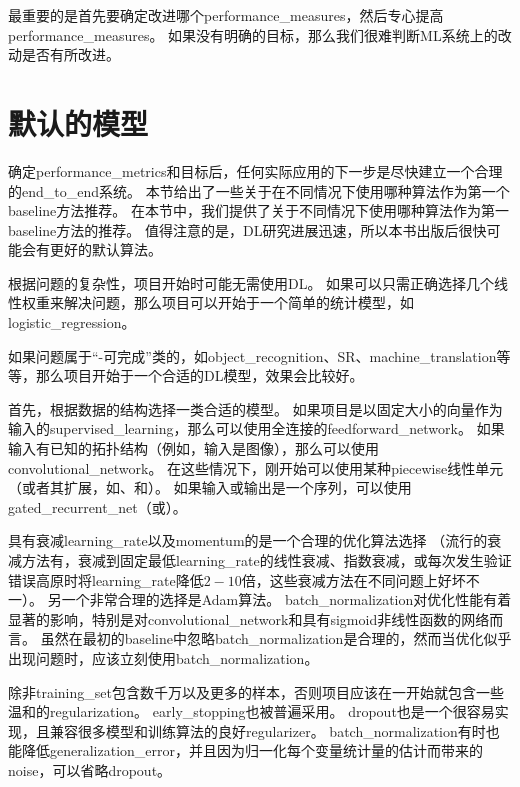 最重要的是首先要确定改进哪个\gls{performance_measures}，然后专心提高\gls{performance_measures}。
如果没有明确的目标，那么我们很难判断\gls{ML}系统上的改动是否有所改进。


\section{默认的模型}
\label{sec:default_baseline_models}
确定\gls{performance_metrics}和目标后，任何实际应用的下一步是尽快建立一个合理的\gls{end_to_end}系统。
本节给出了一些关于在不同情况下使用哪种算法作为第一个\gls{baseline}方法推荐。
在本节中，我们提供了关于不同情况下使用哪种算法作为第一\gls{baseline}方法的推荐。
值得注意的是，\gls{DL}研究进展迅速，所以本书出版后很快可能会有更好的默认算法。

根据问题的复杂性，项目开始时可能无需使用\gls{DL}。
如果可以只需正确选择几个线性权重来解决问题，那么项目可以开始于一个简单的统计模型，如\gls{logistic_regression}。


如果问题属于``-可完成''类的，如\gls{object_recognition}、\gls{SR}、\gls{machine_translation}等等，那么项目开始于一个合适的\gls{DL}模型，效果会比较好。


首先，根据数据的结构选择一类合适的模型。
如果项目是以固定大小的向量作为输入的\gls{supervised_learning}，那么可以使用全连接的\gls{feedforward_network}。
如果输入有已知的拓扑结构（例如，输入是图像），那么可以使用\gls{convolutional_network}。
在这些情况下，刚开始可以使用某种\gls{piecewise}线性单元（或者其扩展，如、和）。
如果输入或输出是一个序列，可以使用\gls{gated_recurrent_net}（或）。

具有衰减\gls{learning_rate}以及\gls{momentum}的是一个合理的优化算法选择
（流行的衰减方法有，衰减到固定最低\gls{learning_rate}的线性衰减、指数衰减，或每次发生验证错误高原时将\gls{learning_rate}降低$2-10$倍，这些衰减方法在不同问题上好坏不一）。
另一个非常合理的选择是Adam算法。
\gls{batch_normalization}对优化性能有着显著的影响，特别是对\gls{convolutional_network}和具有\gls{sigmoid}非线性函数的网络而言。
虽然在最初的\gls{baseline}中忽略\gls{batch_normalization}是合理的，然而当优化似乎出现问题时，应该立刻使用\gls{batch_normalization}。


除非\gls{training_set}包含数千万以及更多的样本，否则项目应该在一开始就包含一些温和的\gls{regularization}。 
\gls{early_stopping}也被普遍采用。
\gls{dropout}也是一个很容易实现，且兼容很多模型和训练算法的良好\gls{regularizer}。
\gls{batch_normalization}有时也能降低\gls{generalization_error}，并且因为归一化每个变量统计量的估计而带来的\gls{noise}，可以省略\gls{dropout}。%


